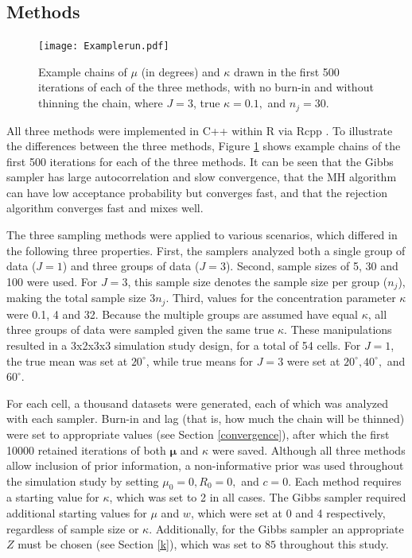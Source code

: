 \documentclass[]{gSCS2e}
\theoremstyle{plain}
\theoremstyle{definition}
\theoremstyle{remark}
\begin{document}
\subsection{Methods}

\begin{figure}[bt]
\centering
\texttt{[image: Examplerun.pdf]}
\caption{Example chains of $\mu$ (in degrees) and $\kappa$ drawn in the first 500 iterations of each of the three methods, with no burn-in and without thinning the chain, where $J = 3$, true $\kappa = 0.1,$ and $n_j = 30$.}
\label{example}
\end{figure}

All three methods were implemented in C++ within R \citep{team2013r} via Rcpp \citep{rcpp}. To illustrate the differences between the three methods, Figure \ref{example} shows example chains of the first 500 iterations for each of the three methods. It can be seen that the Gibbs sampler has large autocorrelation and slow convergence, that the MH algorithm can have low acceptance probability but converges fast, and that the rejection algorithm converges fast and mixes well. 

The three sampling methods were applied to various scenarios, which differed in the following three properties. First, the samplers  analyzed both a single group of data ($J=1$) and three groups of data ($J=3$). Second, sample sizes of 5, 30 and 100 were used. For $J=3$, this sample size denotes the sample size per group ($n_j$), making the total sample size $3n_j$. Third, values for the concentration parameter $\kappa$ were 0.1, 4 and 32. Because the multiple groups are assumed have equal $\kappa$, all three groups of data were sampled given the same true $\kappa$. These manipulations resulted in a 3x2x3x3 simulation study design, for a total of 54 cells. For $J=1$, the true mean was set at $20^\circ$, while true means for $J=3$ were set at $20^\circ, 40^\circ,$ and $60^\circ$.

For each cell, a thousand datasets were generated, each of which was analyzed with each sampler. Burn-in and lag (that is, how much the chain will be thinned) were set to appropriate values (see Section \ref{convergence}), after which the first 10000 retained iterations of both $\boldsymbol\mu$ and $\kappa$ were saved. Although all three methods allow inclusion of prior information, a non-informative prior was used throughout the simulation study by setting $\mu_0=0, R_0=0,$ and $c=0$. Each method requires a starting value for $\kappa$, which was set to 2 in all cases. The Gibbs sampler required additional starting values for $\mu$ and $w$, which were set at 0 and 4 respectively, regardless of sample size or $\kappa$. Additionally, for the Gibbs sampler an appropriate $Z$ must be chosen (see Section \ref{k}), which was set to $85$ throughout this study. 
\end{document}
